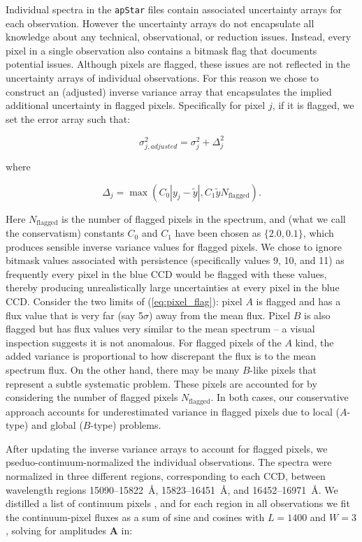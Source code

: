\documentclass[12pt,preprint]{aastex}
\newcommand{\Dvector}[1]{\boldsymbol{#1}}
\begin{document}
Individual spectra in the \texttt{apStar} files contain associated uncertainty arrays
for each observation.  However the uncertainty arrays do not encapsulate all knowledge
about any technical, observational, or reduction issues.  Instead, every pixel
in a single observation also contains a bitmask flag that documents potential
issues.  Although pixels are flagged, these issues are not reflected in the
uncertainty arrays of individual observations.  For this reason we chose to construct
an (adjusted) inverse variance array that encapsulates the implied additional 
uncertainty in flagged pixels.  Specifically for pixel $j$, if it is flagged, we set the error
array such that:

\begin{equation}
\sigma_{j,adjusted}^2 = \sigma_{j}^2 + \Delta_{j}^2
\end{equation}

\noindent{}where

\begin{equation}
\Delta_{j} = \max{\left(C_{0}|y_{j} - \widetilde{y}|,C_{1}\widetilde{y}N_\mathrm{flagged}\right)} .
\label{eq:pixel_flag}
\end{equation}

Here $N_\mathrm{flagged}$ is the number of flagged pixels in the spectrum, and (what
we call the conservatism) constants $C_0$ and $C_1$ have been chosen as 
$\{2.0,0.1\}$, which produces sensible inverse variance values for flagged
pixels.  We chose to ignore bitmask values associated with persistence 
(specifically values 9, 10, and 11) as frequently every pixel in the blue CCD
would be flagged with these values, thereby producing unrealistically large 
uncertainties at every pixel in the blue CCD.  Consider the two limits of (\ref{eq:pixel_flag}):
pixel $A$ is flagged and has a flux value that is very far (say 5$\sigma$) 
away from the mean flux. Pixel $B$ is also flagged but has flux values very
similar to the mean spectrum -- a visual inspection suggests it is not anomalous.
For flagged pixels of the $A$ kind, the added variance is proportional to how
discrepant the flux is to the mean spectrum flux. On the other hand, there may be many 
$B$-like pixels that represent a subtle systematic problem. These pixels are
accounted for by considering the number of flagged pixels $N_\mathrm{flagged}$. In both
cases, our conservative approach accounts for underestimated variance in flagged pixels 
due to local ($A$-type) and global ($B$-type) problems.


After updating the inverse variance arrays to account for flagged pixels, we
pseduo-continuum-normalized the individual observations. The spectra were 
normalized in three different regions, corresponding to each CCD, between
wavelength regions 15090--15822~\AA, 15823--16451~\AA, and 16452--16971~\AA.
We distilled a list of continuum pixels \citep[following the initial 
identification in][]{tc}, and for each region in all observations we fit
the continuum-pixel fluxes as a sum of sine and cosines with $L = 1400$ and 
$W = 3$, solving for amplitudes $\Dvector{A}$ in:
\end{document}
